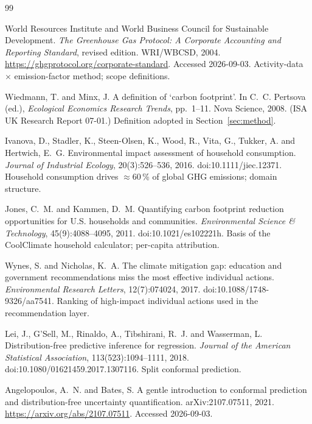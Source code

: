 \documentclass[11pt,a4paper]{article}
\begin{document}
\begin{thebibliography}{99}
\small

World Resources Institute and World Business Council for Sustainable Development.
\textit{The Greenhouse Gas Protocol: A Corporate Accounting and Reporting Standard}, revised edition. WRI/WBCSD, 2004.
\url{https://ghgprotocol.org/corporate-standard}. Accessed 2026-09-03.
Activity-data $\times$ emission-factor method; scope definitions.

Wiedmann, T. and Minx, J. A definition of `carbon footprint'. In C.~C. Pertsova (ed.),
\textit{Ecological Economics Research Trends}, pp.~1--11. Nova Science, 2008.
(ISA UK Research Report 07-01.) Definition adopted in Section~\ref{sec:method}.

Ivanova, D., Stadler, K., Steen-Olsen, K., Wood, R., Vita, G., Tukker, A. and Hertwich, E.~G.
Environmental impact assessment of household consumption.
\textit{Journal of Industrial Ecology}, 20(3):526--536, 2016. doi:10.1111/jiec.12371.
Household consumption drives $\approx$60\,\% of global GHG emissions; domain structure.

Jones, C.~M. and Kammen, D.~M. Quantifying carbon footprint reduction opportunities for U.S. households and communities.
\textit{Environmental Science \& Technology}, 45(9):4088--4095, 2011. doi:10.1021/es102221h.
Basis of the CoolClimate household calculator; per-capita attribution.

Wynes, S. and Nicholas, K.~A. The climate mitigation gap: education and government recommendations miss the most effective individual actions.
\textit{Environmental Research Letters}, 12(7):074024, 2017. doi:10.1088/1748-9326/aa7541.
Ranking of high-impact individual actions used in the recommendation layer.

Lei, J., G'Sell, M., Rinaldo, A., Tibshirani, R.~J. and Wasserman, L. Distribution-free predictive inference for regression.
\textit{Journal of the American Statistical Association}, 113(523):1094--1111, 2018. doi:10.1080/01621459.2017.1307116.
Split conformal prediction.

Angelopoulos, A.~N. and Bates, S. A gentle introduction to conformal prediction and distribution-free uncertainty quantification.
arXiv:2107.07511, 2021. \url{https://arxiv.org/abs/2107.07511}. Accessed 2026-09-03.


\end{thebibliography}
\end{document}
